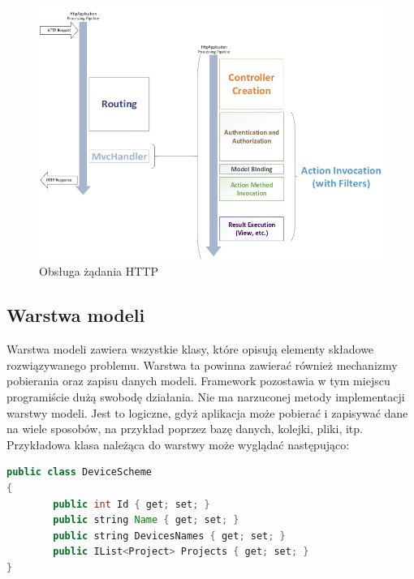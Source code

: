 \begin{figure}[b]
	\includegraphics[width=140mm]{./img/mvc-diagram.png}
	\caption{Obsługa żądania HTTP}
	\label{fig:mvc-diagram}
\end{figure}




\subsection{Warstwa modeli}
Warstwa modeli zawiera wszystkie klasy, które opisują elementy składowe rozwiązywanego problemu. Warstwa ta powinna zawierać również mechanizmy pobierania oraz zapisu danych modeli. 
Framework pozostawia w tym miejscu programiście dużą swobodę działania. Nie ma narzuconej metody implementacji warstwy modeli. Jest to logiczne, gdyż aplikacja może pobierać i zapisywać dane na wiele sposobów, na przykład poprzez bazę danych, kolejki, pliki, itp. 
Przykładowa klasa należąca do warstwy może wyglądać następująco:
\begin{lstlisting}[language=Java]
public class DeviceScheme
{
        public int Id { get; set; }
        public string Name { get; set; }
        public string DevicesNames { get; set; }
        public IList<Project> Projects { get; set; }
}
\end{lstlisting}
